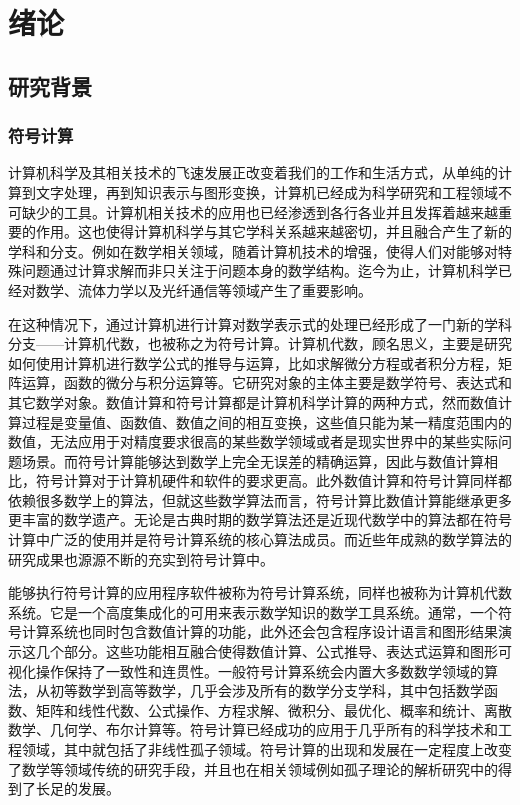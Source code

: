 \chapter{绪论}
\section{研究背景}
\subsection{符号计算}
计算机科学及其相关技术的飞速发展正改变着我们的工作和生活方式，从单纯的计算到文字处理，再到知识表示与图形变换，计算机已经成为科学研究和工程领域不可缺少的工具。计算机相关技术的应用也已经渗透到各行各业并且发挥着越来越重要的作用。这也使得计算机科学与其它学科关系越来越密切，并且融合产生了新的学科和分支。例如在数学相关领域，随着计算机技术的增强，使得人们对能够对特殊问题通过计算求解而非只关注于问题本身的数学结构。迄今为止，计算机科学已经对数学、流体力学以及光纤通信等领域产生了重要影响。

在这种情况下，通过计算机进行计算对数学表示式的处理已经形成了一门新的学科分支——计算机代数，也被称之为符号计算。计算机代数，顾名思义，主要是研究如何使用计算机进行数学公式的推导与运算，比如求解微分方程或者积分方程，矩阵运算，函数的微分与积分运算等。它研究对象的主体主要是数学符号、表达式和其它数学对象。数值计算和符号计算都是计算机科学计算的两种方式，然而数值计算过程是变量值、函数值、数值之间的相互变换，这些值只能为某一精度范围内的数值，无法应用于对精度要求很高的某些数学领域或者是现实世界中的某些实际问题场景。而符号计算能够达到数学上完全无误差的精确运算，因此与数值计算相比，符号计算对于计算机硬件和软件的要求更高。此外数值计算和符号计算同样都依赖很多数学上的算法，但就这些数学算法而言，符号计算比数值计算能继承更多更丰富的数学遗产。无论是古典时期的数学算法还是近现代数学中的算法都在符号计算中广泛的使用并是符号计算系统的核心算法成员。而近些年成熟的数学算法的研究成果也源源不断的充实到符号计算中。

能够执行符号计算的应用程序软件被称为符号计算系统，同样也被称为计算机代数系统。它是一个高度集成化的可用来表示数学知识的数学工具系统。通常，一个符号计算系统也同时包含数值计算的功能，此外还会包含程序设计语言和图形结果演示这几个部分。这些功能相互融合使得数值计算、公式推导、表达式运算和图形可视化操作保持了一致性和连贯性。一般符号计算系统会内置大多数数学领域的算法，从初等数学到高等数学，几乎会涉及所有的数学分支学科，其中包括数学函数、矩阵和线性代数、公式操作、方程求解、微积分、最优化、概率和统计、离散数学、几何学、布尔计算等。符号计算已经成功的应用于几乎所有的科学技术和工程领域，其中就包括了非线性孤子领域。符号计算的出现和发展在一定程度上改变了数学等领域传统的研究手段，并且也在相关领域例如孤子理论的解析研究中的得到了长足的发展。

